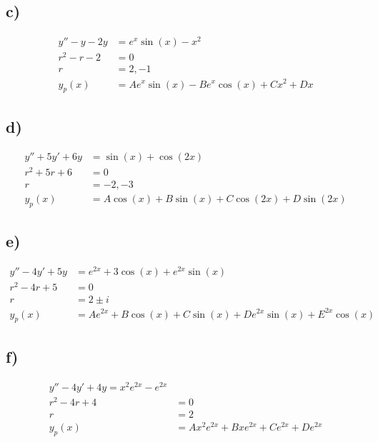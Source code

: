 \documentclass{article}
\begin{document}
\subsection{c)}
\begin{align*}
	y'' - y -2y & = e^x\sin(x) - x^2 \\
	r^2 - r - 2 & = 0 \\
	r & = 2,-1 \\
	y_p(x) & = Ae^x\sin(x) - Be^x\cos(x) + Cx^2 + Dx
\end{align*}

\subsection{d)}
\begin{align*}
	y'' + 5y' + 6y & = \sin(x) + \cos(2x) \\
	r^2 + 5r + 6 & = 0 \\
	r & = -2,-3 \\
	y_p(x) & = A\cos(x) + B\sin(x) + C\cos(2x) + D\sin(2x)
\end{align*}

\subsection{e)}
\begin{align*}
	y'' - 4y' + 5y & = e^{2x} + 3\cos(x) + e^{2x}\sin(x) \\
	r^2 - 4r + 5 & = 0 \\
	r & = 2 \pm i \\
	y_p(x) & = Ae^{2x} + B\cos(x) + C\sin(x) + De^{2x}\sin(x) + E^{2x}\cos(x)
\end{align*}

\subsection{f)}
\begin{align*}
	y'' - 4y' + 4y = x^2e^{2x} - e^{2x} \\
	r^2 - 4r + 4 & = 0 \\
	r & = 2 \\
	y_p(x) & = Ax^2e^{2x} + Bxe^{2x} + Ce^{2x} + De^{2x}
\end{align*}
\end{document}
